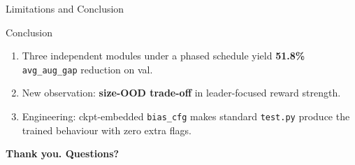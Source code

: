 \documentclass[aspectratio=169,11pt]{beamer}
\newcommand{\tightitems}{%
  \setlength{\itemsep}{1.5pt}%
  \setlength{\parsep}{0pt}%
  \setlength{\topsep}{2pt}%
}
\begin{document}
\begin{frame}[t]{Limitations and Conclusion}
  \footnotesize
  \begin{block}{Conclusion}
    \begin{enumerate}\tightitems
      \item Three independent modules under a phased schedule yield \textbf{51.8\%} \texttt{avg\_aug\_gap} reduction on val.
      \item New observation: \textbf{size-OOD trade-off} in leader-focused reward strength.
      \item Engineering: ckpt-embedded \texttt{bias\_cfg} makes standard \texttt{test.py} produce the trained behaviour with zero extra flags.
    \end{enumerate}
  \end{block}

  \centering
  \vspace{0.30cm}
  {\large\color{sdmblue}\textbf{Thank you. Questions?}}
\end{frame}
\end{document}
